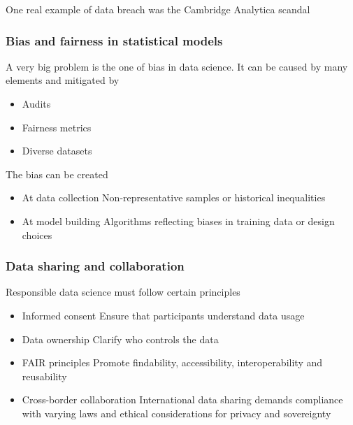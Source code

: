 One real example of data breach was the Cambridge Analytica scandal



















\subsubsection{Bias and fairness in statistical models}

A very big problem is the one of bias in data science. It can be caused by many elements and mitigated by
\begin{itemize}
    \item Audits
    \item Fairness metrics
    \item Diverse datasets
\end{itemize}

The bias can be created 
\begin{itemize}
    \item At data collection \ra Non-representative samples or historical inequalities
    \item At model building \ra Algorithms reflecting biases in training data or design choices
\end{itemize}



















\subsubsection{Data sharing and collaboration}

Responsible data science must follow certain principles

\begin{itemize}
    \item Informed consent \ra Ensure that participants understand data usage
    \item Data ownership \ra Clarify who controls the data 
    \item FAIR principles \ra Promote findability, accessibility, interoperability and reusability
    \item Cross-border collaboration \ra International data sharing demands compliance with varying laws and ethical considerations for privacy and sovereignty
\end{itemize}

